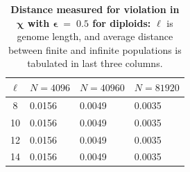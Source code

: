 \begin{table}[ht]
\caption{\textbf{Distance measured for violation in $\bm{\chi}$ with $\bm{\epsilon} \;=\; 0.5$ for diploids:} $\ell$ is genome length, 
and average distance between finite and 
infinite populations is tabulated in last three columns.}
\centering
\begin{tabularx}{0.75\textwidth}{ c *{3}{X}}
\toprule
$\ell$ & $N = 4096$ & $N = 40960$ & $N = 81920$  \\
\midrule
8 & 0.0156	&  0.0049	& 0.0035 \\	
10 & 0.0156	&  0.0049	& 0.0035 \\
12 & 0.0156	&  0.0049	& 0.0035 \\
14 & 0.0156	&  0.0049	& 0.0035 \\
\bottomrule
\end{tabularx}
\label{distanceChiDipEps0.5}
\end{table} 


 
